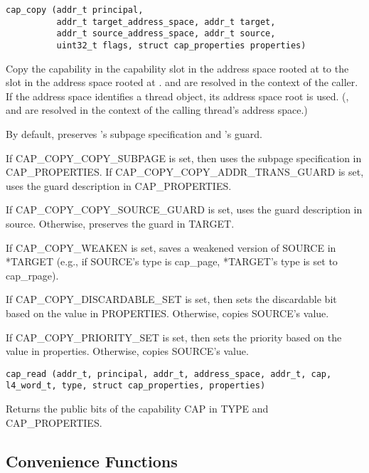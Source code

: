 \begin{lstlisting}
cap_copy (addr_t principal,
          addr_t target_address_space, addr_t target,
          addr_t source_address_space, addr_t source,
          uint32_t flags, struct cap_properties properties)
\end{lstlisting}

Copy the capability in the capability slot  in the address
space rooted at  to the slot 
in the address space rooted at .
 and  are
resolved in the context of the caller.  If the address space
identifies a thread object, its address space root is used.
(,  and
 are resolved in the context of the
calling thread's address space.)

By default, preserves 's subpage specification and
's guard.

If CAP\_COPY\_COPY\_SUBPAGE is set, then uses the subpage
specification in CAP\_PROPERTIES.  If CAP\_COPY\_COPY\_ADDR\_TRANS\_GUARD
is set, uses the guard description in CAP\_PROPERTIES.

If CAP\_COPY\_COPY\_SOURCE\_GUARD is set, uses the guard description in
source.  Otherwise, preserves the guard in TARGET.

If CAP\_COPY\_WEAKEN is set, saves a weakened version of SOURCE in
*TARGET (e.g., if SOURCE's type is cap\_page, *TARGET's type is set
to cap\_rpage).

If CAP\_COPY\_DISCARDABLE\_SET is set, then sets the discardable bit
based on the value in PROPERTIES.  Otherwise, copies SOURCE's
value.

If CAP\_COPY\_PRIORITY\_SET is set, then sets the priority based on
the value in properties.  Otherwise, copies SOURCE's value.


\begin{lstlisting}
cap_read (addr_t, principal, addr_t, address_space, addr_t, cap,
l4_word_t, type, struct cap_properties, properties)
\end{lstlisting}

Returns the public bits of the capability CAP in TYPE and
CAP\_PROPERTIES.

\subsection{Convenience Functions}

